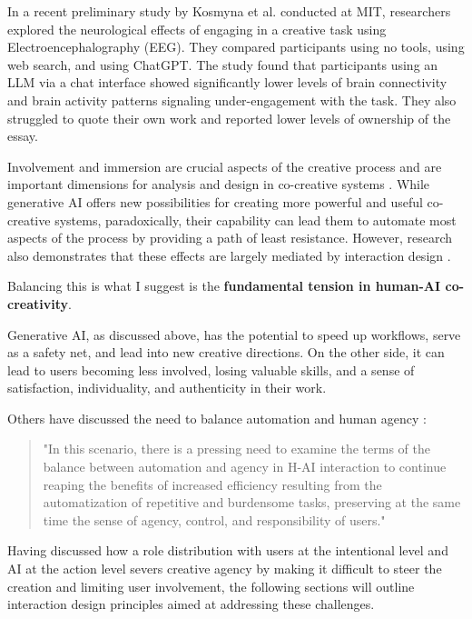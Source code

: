 In a recent preliminary study by Kosmyna et al. \cite{Kosmyna2025-cm} conducted at MIT, researchers explored the neurological effects of engaging in a creative task using Electroencephalography (EEG). They compared participants using no tools, using web search, and using ChatGPT. The study found that participants using an LLM via a chat interface showed significantly lower levels of brain connectivity and brain activity patterns signaling under-engagement with the task. They also struggled to quote their own work and reported lower levels of ownership of the essay.

Involvement and immersion are crucial aspects of the creative process \cite{Amabile1996-pt, Csikszentmihalyi1997-ui} and are important dimensions for analysis and design in co-creative systems \cite{Davis2016-te, Cherry2014-ty, Rezwana2022-ui, Clark2018-yf, Lawton2023-gd, Yuan2022-kb, Li2024-yh, Kantosalo2015-pk, Resnick2005-fs}. While generative AI offers new possibilities for creating more powerful and useful co-creative systems, paradoxically, their capability can lead them to automate most aspects of the process by providing a path of least resistance. However, research also demonstrates that these effects are largely mediated by interaction design \cite{Kim2023-wt, Essel2024-qc}.

Balancing this is what I suggest is the \textbf{fundamental tension in human-AI co-creativity}.

Generative AI, as discussed above, has the potential to speed up workflows, serve as a safety net, and lead into new creative directions. On the other side, it can lead to users becoming less involved, losing valuable skills, and a sense of satisfaction, individuality, and authenticity in their work.

Others have discussed the need to balance automation and human agency \cite{Moruzzi2024-cq}:
\begin{quote}
    "In this scenario, there is a pressing need to examine the terms of the balance between automation and agency in H-AI interaction to continue reaping the benefits of increased efficiency resulting from the automatization of repetitive and burdensome tasks, preserving at the same time the sense of agency, control, and responsibility of users."
\end{quote}

Having discussed how a role distribution with users at the intentional level and AI at the action level severs creative agency by making it difficult to steer the creation and limiting user involvement, the following sections will outline interaction design principles aimed at addressing these challenges.

